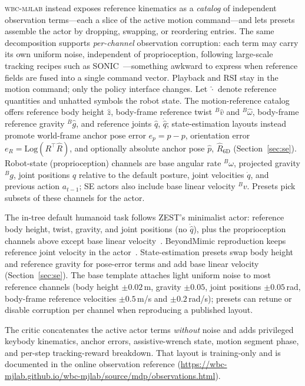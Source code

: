 \documentclass[11pt,a4paper]{article}
\begin{document}
\textsc{wbc-mjlab} instead exposes reference kinematics as a \emph{catalog} of
independent observation terms---each a slice of the active motion command---and
lets presets assemble the actor by dropping, swapping, or reordering entries.
The same decomposition supports \emph{per-channel} observation corruption: each
term may carry its own uniform noise, independent of proprioception, following
large-scale tracking recipes such as SONIC~\citep{sonic2025}---something awkward
to express when reference fields are fused into a single command vector.
Playback and RSI stay in the motion command; only the policy interface changes.
Let $\hat{\cdot}$ denote reference quantities and unhatted symbols the robot state.
The motion-reference catalog offers reference body height $\hat z$, body-frame
reference twist ${}^{B}\hat v$ and ${}^{B}\hat\omega$, body-frame reference
gravity ${}^{B}\hat g$, and reference joints $\hat q$, $\dot{\hat q}$;
state-estimation layouts instead promote world-frame anchor pose error
$e_p=\hat p-p$, orientation error $e_R=\mathrm{Log}(R^{\top}\hat R)$, and
optionally absolute anchor pose $\hat p$, $\hat R_{6\mathrm{D}}$
(Section~\ref{sec:se}). Robot-state (proprioception) channels are base angular
rate ${}^{B}\omega$, projected gravity ${}^{B}g$, joint positions $q$ relative
to the default posture, joint velocities $\dot q$, and previous action
$a_{t-1}$; SE actors also include base linear velocity ${}^{B}v$.
Presets pick subsets of these channels for the actor.

The in-tree default humanoid task follows ZEST's minimalist actor: reference
body height, twist, gravity, and joint positions (no $\dot{\hat q}$), plus the
proprioception channels above except base linear velocity~\citep{zest2026}.
BeyondMimic reproduction keeps reference joint velocity in the actor~\citep{liao2025beyondmimic}.
State-estimation presets swap body height and reference gravity for pose-error
terms and add base linear velocity (Section~\ref{sec:se}). The base template
attaches light uniform noise to most reference channels (body height
$\pm0.02$\,m, gravity $\pm0.05$, joint positions $\pm0.05$\,rad, body-frame
reference velocities $\pm0.5$\,m/s and $\pm0.2$\,rad/s); presets can retune or
disable corruption per channel when reproducing a published layout.

The critic concatenates the active actor terms \emph{without} noise and adds
privileged keybody kinematics, anchor errors, assistive-wrench state, motion
segment phase, and per-step tracking-reward breakdown. That layout is training-only
and is documented in the online observation reference
(\url{https://wbc-mjlab.github.io/wbc-mjlab/source/mdp/observations.html}).
\end{document}
